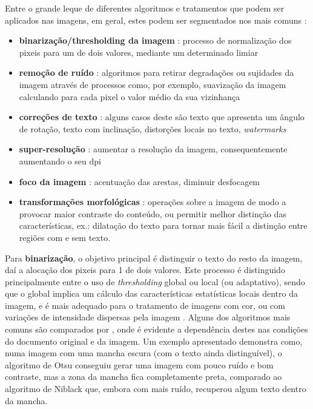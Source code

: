 Entre o grande leque de diferentes algoritmos e tratamentos que podem ser aplicados nas imagens, em geral, estes podem ser segmentados nos mais comuns \citep{9791698}:
\begin{itemize}
    \item \textbf{binarização/thresholding da imagem} : processo de normalização dos pixeis para um de dois valores, mediante um determinado limiar
    \item \textbf{remoção de ruído} : algoritmos para retirar degradações ou sujidades da imagem através de processos como, por exemplo, suavização da imagem calculando para cada pixel o valor médio da sua vizinhança
    \item \textbf{correções de texto} : alguns casos deste são texto que apresenta um ângulo de rotação, texto com inclinação, distorções locais no texto, \textit{watermarks}
    \item \textbf{super-resolução} : aumentar a resolução da imagem, consequentemente aumentando o seu \acrshort{dpi}
    \item \textbf{foco da imagem} : acentuação das arestas, diminuir desfocagem
    \item \textbf{transformações morfológicas} : operações sobre a imagem de modo a provocar maior contraste do conteúdo, ou permitir melhor distinção das características, ex.: dilatação do texto para tornar mais fácil a distinção entre regiões com e sem texto.
\end{itemize}

Para \textbf{binarização}, o objetivo principal é distinguir o texto do resto da imagem, daí a alocação dos pixeis para 1 de dois valores. Este processo é distinguido principalmente entre o uso de \textit{thresholding} global ou local (ou adaptativo), sendo que o global implica um cálculo das características estatísticas locais dentro da imagem, e é mais adequado para o tratamento de imagens com cor, ou com variações de intensidade dispersas pela imagem \citep{9791698}. Alguns dos algoritmos mais comuns são comparados por \cite{9187695}, onde é evidente a dependência destes nas condições do documento original e da imagem. Um exemplo apresentado demonstra como, numa imagem com uma mancha escura (com o texto ainda distinguível), o algoritmo de Otsu conseguiu gerar uma imagem com pouco ruído e bom contraste, mas a zona da mancha fica completamente preta, comparado ao algoritmo de Niblack que, embora com mais ruído, recuperou algum texto dentro da mancha.

